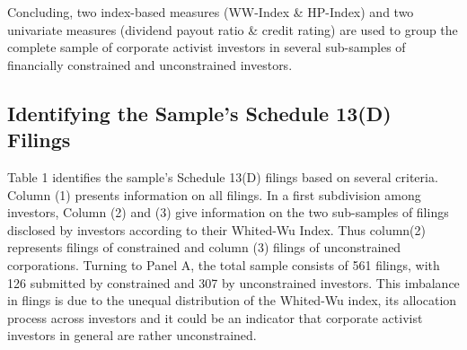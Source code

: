 \documentclass[12pt]{article}
\begin{document}
Concluding, two index-based measures (WW-Index \& HP-Index) and two univariate measures (dividend payout ratio \& credit rating) are used to group the complete sample of corporate activist investors in several sub-samples of financially constrained and unconstrained investors.
\subsection{Identifying the Sample's Schedule 13(D) Filings}

Table 1 identifies the sample's Schedule 13(D) filings based on several criteria. Column (1) presents information on all filings. In a first subdivision among investors, Column (2) and (3) give information on the two sub-samples of filings disclosed by investors according to their Whited-Wu Index. Thus column(2) represents filings of constrained and column (3) filings of unconstrained corporations.
Turning to Panel A, the total sample consists of 561 filings, with 126 submitted by constrained and 307 by unconstrained investors. This imbalance in flings is due to the unequal distribution of the Whited-Wu index, its allocation process across investors and it could be an indicator that corporate activist investors in general are rather unconstrained.
\end{document}
